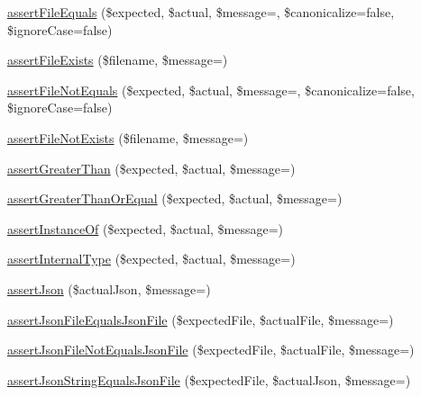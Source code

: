 \begin{DoxyCompactItemize}
\item 
\mbox{\hyperlink{_functions_8php_abace482714c3fab036ceb8ad99b2d56a}{assert\+File\+Equals}} (\$expected, \$actual, \$message=\textquotesingle{}\textquotesingle{}, \$canonicalize=false, \$ignore\+Case=false)
\item 
\mbox{\hyperlink{_functions_8php_ad3898bf710a1acb03b3e17683dd6dd23}{assert\+File\+Exists}} (\$filename, \$message=\textquotesingle{}\textquotesingle{})
\item 
\mbox{\hyperlink{_functions_8php_a8d938168c2d2f4c5d0a160bcffc56136}{assert\+File\+Not\+Equals}} (\$expected, \$actual, \$message=\textquotesingle{}\textquotesingle{}, \$canonicalize=false, \$ignore\+Case=false)
\item 
\mbox{\hyperlink{_functions_8php_a0817fad4d3c1480e89a8b1360ac9a2ee}{assert\+File\+Not\+Exists}} (\$filename, \$message=\textquotesingle{}\textquotesingle{})
\item 
\mbox{\hyperlink{_functions_8php_a7dee19b907f23a8ef39cb4514498797a}{assert\+Greater\+Than}} (\$expected, \$actual, \$message=\textquotesingle{}\textquotesingle{})
\item 
\mbox{\hyperlink{_functions_8php_af3b7e85915750fda23fc9086eed7f477}{assert\+Greater\+Than\+Or\+Equal}} (\$expected, \$actual, \$message=\textquotesingle{}\textquotesingle{})
\item 
\mbox{\hyperlink{_functions_8php_a0ca0839be24ad3e51d4f4e9cf02e5a1d}{assert\+Instance\+Of}} (\$expected, \$actual, \$message=\textquotesingle{}\textquotesingle{})
\item 
\mbox{\hyperlink{_functions_8php_a688bf0b1d569863bbbf042f0663364da}{assert\+Internal\+Type}} (\$expected, \$actual, \$message=\textquotesingle{}\textquotesingle{})
\item 
\mbox{\hyperlink{_functions_8php_aa4ec6184c535737e1dec9b48d8617afb}{assert\+Json}} (\$actual\+Json, \$message=\textquotesingle{}\textquotesingle{})
\item 
\mbox{\hyperlink{_functions_8php_acae2f29204d6fe3692199951ee5b0c0c}{assert\+Json\+File\+Equals\+Json\+File}} (\$expected\+File, \$actual\+File, \$message=\textquotesingle{}\textquotesingle{})
\item 
\mbox{\hyperlink{_functions_8php_a0d935ef2536ac8edf8c13d0a5384e21e}{assert\+Json\+File\+Not\+Equals\+Json\+File}} (\$expected\+File, \$actual\+File, \$message=\textquotesingle{}\textquotesingle{})
\item 
\mbox{\hyperlink{_functions_8php_a36f310768e4214d73d80888c71d625ba}{assert\+Json\+String\+Equals\+Json\+File}} (\$expected\+File, \$actual\+Json, \$message=\textquotesingle{}\textquotesingle{})

\end{DoxyCompactItemize}
